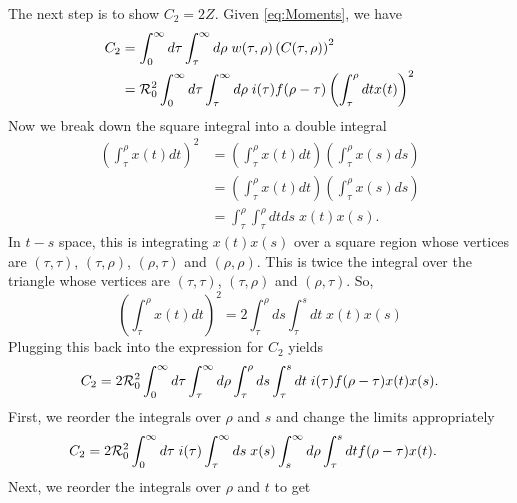 The next step is to show $C_2 = 2Z$.
Given \autoref{eq:Moments}, we have
\begin{align*}
        C_2 &= \int_0^\infty d\tau \int_\tau^\infty d\rho \; w(\tau,\rho) \left(C(\tau,\rho)\right)^2\\
        &= {\mathcal R}_{\mathrm{0}}^2 \int_0^\infty d\tau \int_\tau^\infty d\rho \;i(\tau) f(\rho-\tau) \left(\int_\tau^{\rho} dt x(t)\right)^2
\end{align*}
Now we break down the square integral into a double integral
\begin{align*}
        \left(\int_\tau^\rho x(t)dt\right)^2 &= \left( \int_\tau^\rho x(t) dt\right) \left( \int_\tau^\rho x(s)ds\right)\\
        &=  \left( \int_\tau^\rho x(t) dt\right) \left( \int_\tau^\rho x(s)ds\right)\\
        &=  \int_\tau^\rho \int_\tau^\rho dt ds \; x(t) x(s).
\end{align*}
In $t-s$ space, this is integrating $x(t)x(s)$ over a square region whose vertices are $(\tau,\tau)$, $(\tau,\rho)$, $(\rho,\tau)$ and $(\rho,\rho)$. This is twice the integral over the triangle whose vertices are $(\tau,\tau)$, $(\tau,\rho)$ and $(\rho,\tau)$. So,
\begin{equation*}
        \left(\int_\tau^\rho x(t)dt\right)^2 = 2 \int_\tau^\rho ds \int_\tau^s dt \; x(t)x(s)
\end{equation*}
Plugging this back into the expression for $C_2$ yields
    \begin{equation*}
        C_2 = 2{\mathcal R}_{\mathrm{0}}^2 \int_0^\infty d\tau \int_\tau^\infty d\rho \int_\tau^\rho ds \int_\tau^s dt \; i(\tau) f(\rho-\tau) x(t)x(s).
    \end{equation*}
First, we reorder the integrals over $\rho$ and $s$ and change the limits appropriately
\begin{align*}
    \begin{split}
        C_2 &= 2{\mathcal R}_{\mathrm{0}}^2 \int_0^\infty d\tau \; i(\tau) \int_\tau^\infty ds \; x(s)\int_s^\infty d\rho \int_\tau^s dt  f(\rho-\tau) x(t).
    \end{split}
\end{align*}
Next, we reorder the integrals over $\rho$ and $t$ to get
